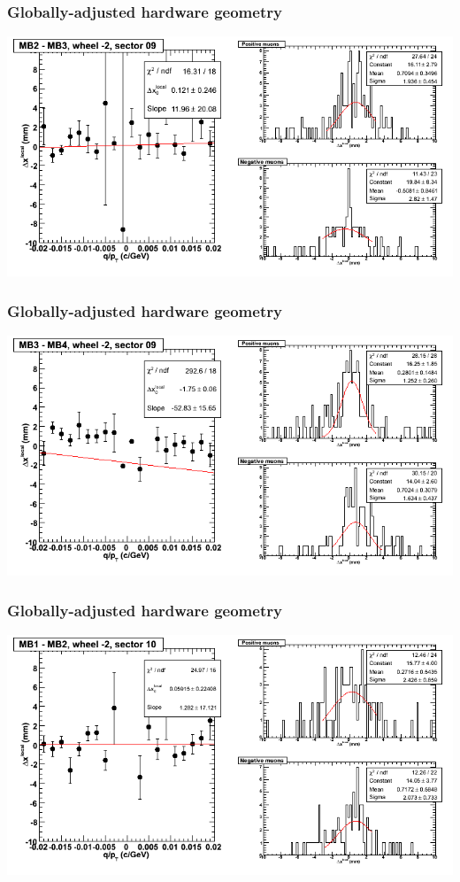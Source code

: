 \documentclass[compress]{beamer}
\begin{document}
\begin{frame}
\frametitle{Globally-adjusted hardware geometry}
\includegraphics[width=\linewidth]{NOV4_segdiffs_HW/dt13_resid_A_09_23.png}
\end{frame}

\begin{frame}
\frametitle{Globally-adjusted hardware geometry}
\includegraphics[width=\linewidth]{NOV4_segdiffs_HW/dt13_resid_A_09_34.png}
\end{frame}

\begin{frame}
\frametitle{Globally-adjusted hardware geometry}
\includegraphics[width=\linewidth]{NOV4_segdiffs_HW/dt13_resid_A_10_12.png}
\end{frame}
\end{document}
